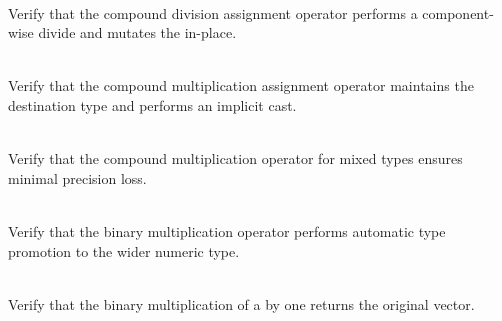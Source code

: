 \begin{DoxyRefList}
\item[{\parbox[t]{\linewidth}{Member \doxylink{group___f_g_m___vec4___division_ga16b591d97ec9692ed447a0988434906b}{Vector4\+DScalar\+Division\+\_\+\+Vector\+Divide\+Equals\+ANumber\+Is\+The\+Same\+Vector\+Scaled} ()}}]\hfill \\
\label{test__test000036}%
%
Verify that the compound division assignment operator performs a component-\/wise divide and mutates the  in-\/place.  
\item[{\parbox[t]{\linewidth}{Member \doxylink{group___f_g_m___vec4___multiplication_ga6e7ade93e5ce3180feef5759d8ca8057}{Vector4\+DScalar\+Multiplication\+\_\+\+Mixed\+Type\+Scalar\+Multiplication\+Assignment\+Does\+Not\+Promote\+Type} ()}}]\hfill \\
\label{test__test000031}%
%
Verify that the compound multiplication assignment operator maintains the destination type and performs an implicit cast.  
\item[{\parbox[t]{\linewidth}{Member \doxylink{group___f_g_m___vec4___multiplication_ga5fda3cce6e4b472c132be97ffbe3ed68}{Vector4\+DScalar\+Multiplication\+\_\+\+Mixed\+Type\+Scalar\+Multiplication\+Assignment\+Ensures\+Minimal\+Precision\+Loss} ()}}]\hfill \\
\label{test__test000032}%
%
Verify that the compound multiplication operator for mixed types ensures minimal precision loss.  
\item[{\parbox[t]{\linewidth}{Member \doxylink{group___f_g_m___vec4___multiplication_ga2b987b952d2c2d1c0c9fce1143189552}{Vector4\+DScalar\+Multiplication\+\_\+\+Mixed\+Type\+Scalar\+Multiplication\+Promotes\+Type} ()}}]\hfill \\
\label{test__test000030}%
%
Verify that the binary multiplication operator performs automatic type promotion to the wider numeric type.  
\item[{\parbox[t]{\linewidth}{Member \doxylink{group___f_g_m___vec4___multiplication_gab29546f90e3d310075c15befb02d71d3}{Vector4\+DScalar\+Multiplication\+\_\+\+Multiplication\+By\+One\+Returns\+Original\+Vector} ()}}]\hfill \\
\label{test__test000026}%
%
Verify that the binary multiplication of a  by one returns the original vector.  
\item[{\parbox[t]{\linewidth}{Member \doxylink{group___f_g_m___vec4___multiplication_ga5dc878b73d630c172ccf5377adcbc664}{Vector4\+DScalar\+Multiplication\+\_\+\+Multiplication\+By\+Zero\+Returns\+Zero\+Vector} ()}}]\hfill \\

\end{DoxyRefList}
